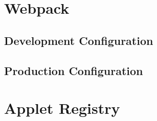 \documentclass[12pt]{article}
\begin{document}
\tableofcontents
\newpage


\section{Webpack}
\subsection{Development Configuration}
\newpage
\subsection{Production Configuration}
\newpage


\section{Applet Registry}
\end{document}

